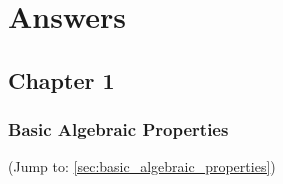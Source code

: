 \documentclass[11pt, oneside]{book}
\begin{document}

\chapter*{Answers}\label{chapter:answers}

\fontsize{9}{11}\selectfont

\section*{Chapter 1} %
\label{sec:chapter_1}

\subsection*{Basic Algebraic Properties} %
\label{sub:basic_algebraic_properties}

(Jump to: \cref{sec:basic_algebraic_properties})
\end{document}
